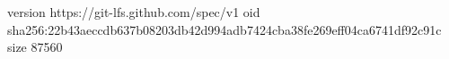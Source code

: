 version https://git-lfs.github.com/spec/v1
oid sha256:22b43aeccdb637b08203db42d994adb7424cba38fe269eff04ca6741df92c91c
size 87560
